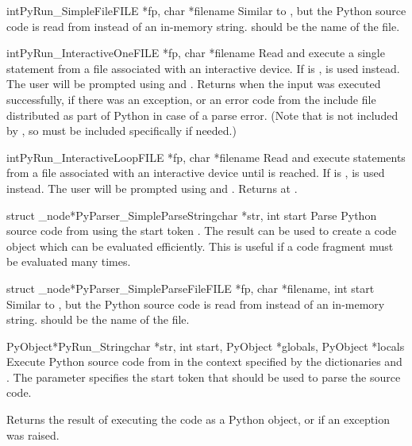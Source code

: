\documentclass{manual}
\begin{document}
\begin{cfuncdesc}{int}{PyRun_SimpleFile}{FILE *fp, char *filename}
  Similar to , but the Python source
  code is read from  instead of an in-memory string.
   should be the name of the file.
\end{cfuncdesc}

\begin{cfuncdesc}{int}{PyRun_InteractiveOne}{FILE *fp, char *filename}
  Read and execute a single statement from a file associated with an
  interactive device.  If  is \NULL,  is
  used instead.  The user will be prompted using  and
  .  Returns  when the input was executed
  successfully,  if there was an exception, or an error code
  from the  include file distributed as part of Python
  in case of a parse error.  (Note that  is not
  included by , so must be included specifically if
  needed.)
\end{cfuncdesc}

\begin{cfuncdesc}{int}{PyRun_InteractiveLoop}{FILE *fp, char *filename}
  Read and execute statements from a file associated with an
  interactive device until \EOF{} is reached.  If  is
  \NULL,  is used instead.  The user will be prompted
  using  and .  Returns  at \EOF.
\end{cfuncdesc}

\begin{cfuncdesc}{struct _node*}{PyParser_SimpleParseString}{char *str,
                                                             int start}
  Parse Python source code from  using the start token
  .  The result can be used to create a code object which
  can be evaluated efficiently.  This is useful if a code fragment
  must be evaluated many times.
\end{cfuncdesc}

\begin{cfuncdesc}{struct _node*}{PyParser_SimpleParseFile}{FILE *fp,
                                 char *filename, int start}
  Similar to , but the Python
  source code is read from  instead of an in-memory string.
   should be the name of the file.
\end{cfuncdesc}

\begin{cfuncdesc}{PyObject*}{PyRun_String}{char *str, int start,
                                           PyObject *globals,
                                           PyObject *locals}
  Execute Python source code from  in the context specified
  by the dictionaries  and .  The parameter
   specifies the start token that should be used to parse
  the source code.

  Returns the result of executing the code as a Python object, or
  \NULL{} if an exception was raised.
\end{cfuncdesc}
\end{document}
